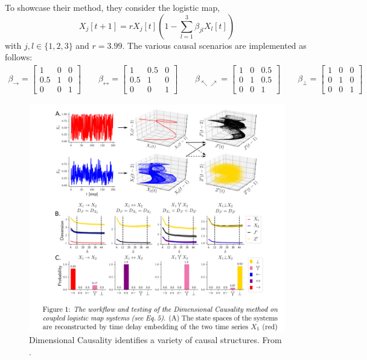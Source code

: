 \documentclass[12pt]{article}
\theoremstyle{definition}
\theoremstyle{remark}
\newcommand{\speccite}[1]{\citetitle{#1} \parencite{#1}}
\begin{document}
To showcase their method, they consider the logistic map,
\[ X_j[t+1] = r X_j[t] ( 1 - \sum_{l = 1}^{3} \beta_{j l} X_l[t] ) \]
with $j, l \in \{1,2,3\}$ and $r = 3.99$. The various causal scenarios are implemented as follows:
\begin{align*}
    \beta_{\to} = \begin{bmatrix} 1 & 0 & 0 \\ 0.5 & 1 & 0 \\ 0 & 0 & 1 \end{bmatrix} \qquad
    \beta_{\leftrightarrow} = \begin{bmatrix} 1 & 0.5 & 0 \\ 0.5 & 1 & 0 \\ 0 & 0 & 1 \end{bmatrix} \qquad
    \beta_{\nwarrow\!\nearrow} = \begin{bmatrix} 1 & 0 & 0.5 \\ 0 & 1 & 0.5 \\ 0 & 0 & 1 \end{bmatrix} \qquad
    \beta_{\perp} = \begin{bmatrix} 1 & 0 & 0 \\ 0 & 1 & 0 \\ 0 & 0 & 1 \end{bmatrix}
\end{align*}

\begin{figure}[H]
    \centering
    \includegraphics[scale=0.4]{figures/dimensional_causality.png}
    \caption{Dimensional Causality identifies a variety of causal structures. From \speccite{benkHo2018exact}.}
    \label{dim_cause}
\end{figure}
\end{document}
